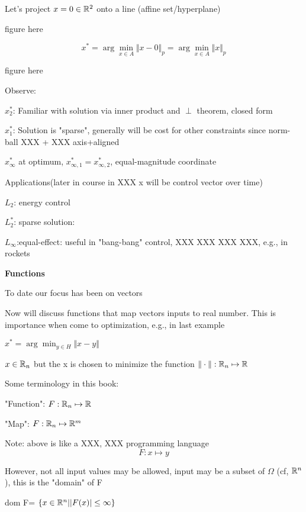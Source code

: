 \begin{marginfigure}
	\centering
	\resizebox{7.5cm}{3cm}{}
	\caption{}
	\label{}
\end{marginfigure}

Let's project $x=0\in\mathbb{R}^{2}$ onto a line (affine set/hyperplane)

figure here

$$x^{*}=\arg\min_{x\in A} \Vert x-0\Vert_{p}=\arg\min_{x\in A} \Vert x\Vert_{p}$$


figure here

Observe:

$x_{2}^{*}$: Familiar with solution via inner product and $\perp$ theorem, closed form

$x_{1}^{*}$: Solution is "sparse", generally will be cost for other constraints since norm-ball XXX + XXX axis+aligned

$x_{\infty}^{*}$ at optimum, $x_{\infty, 1}^{*}=x_{\infty, 2}^{*}$, equal-magnitude coordinate

Applications(later in course in XXX x will be control vector over time)

$L_{2}$: energy control


$L_{2}^{*}$: sparse solution:


$L_{\infty}$:equal-effect: useful in "bang-bang" control, XXX XXX XXX XXX, e.g., in rockets


\vspace{0.5cm}
\noindent\textbf{Functions}

To date our focus has been on vectors

Now will discuss functions that map vectors inputs to real number. This is importance when come to optimization, e.g., in last example

$x^{*}=\arg\min_{y\in H} \Vert x-y\Vert$

$x\in\mathbb{R}_{n}$ but the x is chosen to minimize the function $\Vert\cdot\Vert :\mathbb{R}_{n}\mapsto\mathbb{R}$

Some terminology in this book:

"Function":  $F:\mathbb{R}_{n}\mapsto \mathbb{R}$

"Map":  $F:\mathbb{R}_{n}\mapsto \mathbb{R}^{m}$

Note: above is like a XXX, XXX programming language
$$F: x \mapsto y$$

However, not all input values may be allowed, input may be a subset of $\Omega$ (cf, $\mathbb{R}^{n}$), this is the "domain" of F

dom F= $\{x\in\mathbb{R}^{n}|\vert F(x)\vert\leq\infty\}$



